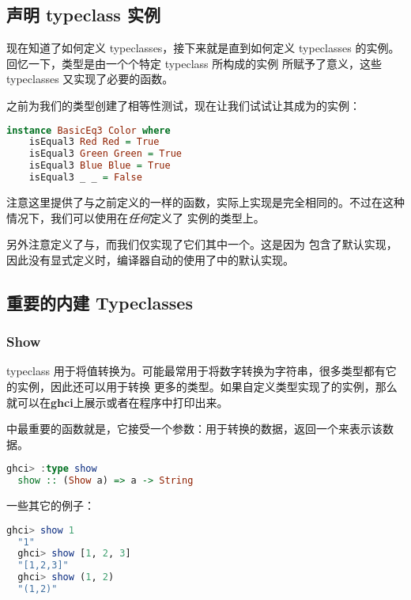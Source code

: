 \documentclass[./main.tex]{subfiles}
\begin{document}
\subsection*{声明 typeclass 实例}

现在知道了如何定义 typeclasses，接下来就是直到如何定义 typeclasses 的实例。回忆一下，类型是由一个个特定 typeclass 所构成的实例
所赋予了意义，这些 typeclasses 又实现了必要的函数。

之前为我们的类型创建了相等性测试，现在让我们试试让其成为的实例：

\begin{lstlisting}[language=Haskell]
  instance BasicEq3 Color where
    isEqual3 Red Red = True
    isEqual3 Green Green = True
    isEqual3 Blue Blue = True
    isEqual3 _ _ = False
\end{lstlisting}

注意这里提供了与之前定义的一样的函数，实际上实现是完全相同的。不过在这种情况下，我们可以使用在\textit{任何}定义了
实例的类型上。

另外注意定义了与，而我们仅实现了它们其中一个。这是因为
包含了默认实现，因此没有显式定义时，编译器自动的使用了中的默认实现。

\subsection*{重要的内建 Typeclasses}

\subsubsection*{Show}

 typeclass 用于将值转换为。可能最常用于将数字转换为字符串，很多类型都有它的实例，因此还可以用于转换
更多的类型。如果自定义类型实现了的实例，那么就可以在\textbf{ghci}上展示或者在程序中打印出来。

中最重要的函数就是，它接受一个参数：用于转换的数据，返回一个来表示该数据。

\begin{lstlisting}[language=Haskell]
  ghci> :type show
  show :: (Show a) => a -> String
\end{lstlisting}

一些其它的例子：

\begin{lstlisting}[language=Haskell]
  ghci> show 1
  "1"
  ghci> show [1, 2, 3]
  "[1,2,3]"
  ghci> show (1, 2)
  "(1,2)"
\end{lstlisting}
\end{document}
